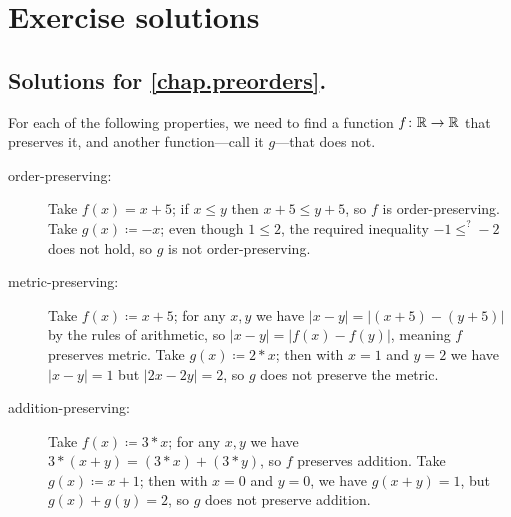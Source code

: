 \documentclass[7Sketches]{subfiles}
\begin{document}
\chapter{Exercise solutions}\label{chap.solutions}

\section[Solutions for Chapter 1]{Solutions for \cref{chap.preorders}.}

{
For each of the following properties, we need to find a function $f\colon\mathbb{R}\to\mathbb{R}$ that preserves it, and another function---call it $g$---that does not.
\begin{description}
	\item[order-preserving:] Take $f(x)=x+5$; if $x\leq y$ then $x+5\leq y+5$, so $f$ is order-preserving. Take $g(x)\coloneqq -x$; even though $1\leq 2$, the required inequality $-1\leq^{?} -2$ does not hold, so $g$ is not order-preserving.
	\item[metric-preserving:] Take $f(x)\coloneqq x+5$; for any $x,y$ we have $|x-y|=|(x+5)-(y+5)|$ by the rules of arithmetic, so $|x-y|=|f(x)-f(y)|$, meaning $f$ preserves metric. Take $g(x)\coloneqq 2*x$; then with $x=1$ and $y=2$ we have $|x-y|=1$ but $|2x-2y|=2$, so $g$ does not preserve the metric.
	\item[addition-preserving:] Take $f(x)\coloneqq 3*x$; for any $x,y$ we have $3*(x+y)=(3*x)+(3*y)$, so $f$ preserves addition. Take $g(x)\coloneqq x+1$; then with $x=0$ and $y=0$, we have $g(x+y)=1$, but $g(x)+g(y)=2$, so $g$ does not preserve addition.
\end{description}
}
\end{document}
